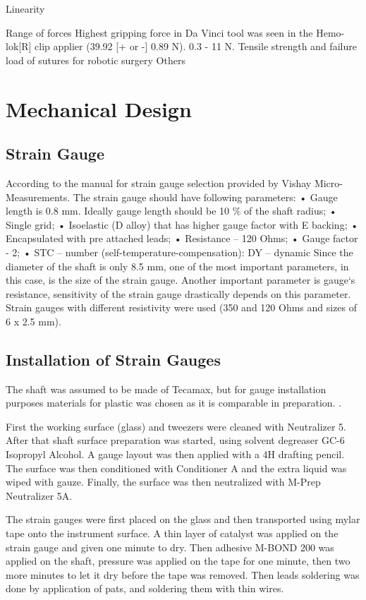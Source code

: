 	Linearity
	
	Range of forces 
	Highest gripping force in Da Vinci tool was seen in the Hemo-lok[R] clip applier (39.92 [+ or -] 0.89 N).
	0.3 - 11 N. 
	Tensile strength and failure load of sutures for robotic surgery
	Others

\section{Mechanical Design}
\label{sec:mechDes}

	\subsection{Strain Gauge}
	\label{sec:SGReq}
	According to the manual for strain gauge selection provided by Vishay Micro-Measurements. The strain gauge should have following parameters:
	• Gauge length is 0.8 mm. Ideally gauge length should be 10 \% of the shaft radius;
	• Single grid;
	• Isoelastic (D alloy) that has higher gauge factor with E backing;
	• Encapsulated with pre attached leads;
	• Resistance – 120 Ohms;
	• Gauge factor - 2;
	• STC – number (self-temperature-compensation): DY – dynamic
	Since the diameter of the shaft is only 8.5 mm, one of the most important parameters, in this
	case, is the size of the strain gauge. Another important parameter is gauge‘s resistance, sensitivity
	of the strain gauge drastically depends on this parameter. Strain gauges with different resistivity
	were used (350 and 120 Ohms and sizes of 6 x 2.5 mm).

	\subsection{Installation of Strain Gauges}
	\label{sec:instSG}

	The shaft was assumed to be made of Tecamax, but for gauge installation purposes materials for plastic was chosen as it is comparable in preparation. \cite{StrGugeInst}.

	First the working surface (glass) and tweezers were cleaned with Neutralizer 5. After that shaft surface preparation was started, using solvent degreaser GC-6 Isopropyl Alcohol. A gauge layout was then applied with a 4H drafting pencil. The surface was then conditioned with Conditioner A and the extra liquid was wiped with gauze. Finally, the surface was then neutralized with M-Prep Neutralizer 5A. \cite{StrGugeInst}

	The strain gauges were first placed on the glass and then transported using mylar tape onto the instrument surface. A thin layer of catalyst was applied on the strain gauge and given one minute to dry. Then adhesive M-BOND 200 was applied on the shaft, pressure was applied on the tape for one minute, then two more minutes to let it dry before the tape was removed. Then leads soldering was done by application of pats, and soldering them with thin wires. \cite{youtube}

